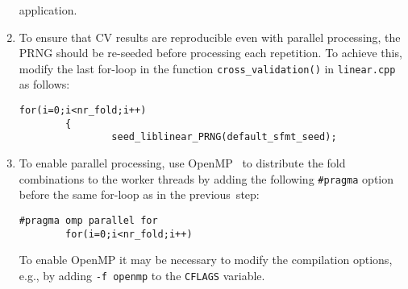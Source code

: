 \begin{enumerate}
  application.
\item To ensure that CV results are reproducible even with parallel processing,
  the PRNG should be re-seeded before processing each repetition.
  To achieve this, modify the last for-loop in the
  function \verb|cross_validation()| in \verb|linear.cpp| as follows:
\begin{Verbatim}[fontsize=\small]
        for(i=0;i<nr_fold;i++)
        {
                seed_liblinear_PRNG(default_sfmt_seed);
\end{Verbatim}
\item To enable parallel processing, use OpenMP~ to distribute
  the fold combinations to the worker threads by adding the following \verb|#pragma|
  option before the same for-loop as in the previous~step:
\begin{Verbatim}[fontsize=\small]
        #pragma omp parallel for
        for(i=0;i<nr_fold;i++)
\end{Verbatim}
To enable OpenMP it may be necessary to modify the compilation
options, e.g., by adding \verb|-f openmp| to the \verb|CFLAGS| variable.
\end{enumerate}


\clearpage
